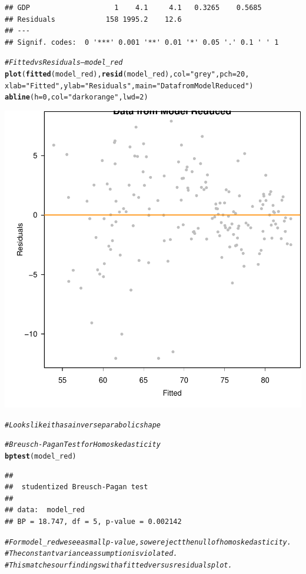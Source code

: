 \documentclass{article}\usepackage[]{graphicx}\usepackage[]{color}
\makeatletter
\newcommand{\hlnum}[1]{\textcolor[rgb]{0.686,0.059,0.569}{#1}}%
\newcommand{\hlstr}[1]{\textcolor[rgb]{0.192,0.494,0.8}{#1}}%
\newcommand{\hlcom}[1]{\textcolor[rgb]{0.678,0.584,0.686}{\textit{#1}}}%
\newcommand{\hlstd}[1]{\textcolor[rgb]{0.345,0.345,0.345}{#1}}%
\newcommand{\hlkwc}[1]{\textcolor[rgb]{0.333,0.667,0.333}{#1}}%
\newcommand{\hlkwd}[1]{\textcolor[rgb]{0.737,0.353,0.396}{\textbf{#1}}}%
\newenvironment{kframe}{%
 \def\at@end@of@kframe{}%
 \ifinner\ifhmode%
  \def\at@end@of@kframe{\end{minipage}}%
  \begin{minipage}{\columnwidth}%
 \fi\fi%
 \def\FrameCommand##1{\hskip\@totalleftmargin \hskip-\fboxsep
 \colorbox{shadecolor}{##1}\hskip-\fboxsep
     \hskip-\linewidth \hskip-\@totalleftmargin \hskip\columnwidth}%
 \MakeFramed {\advance\hsize-\width
   \@totalleftmargin\z@ \linewidth\hsize
   \@setminipage}}%
 {\par\unskip\endMakeFramed%
 \at@end@of@kframe}
\newenvironment{knitrout}{}{} %
\makeatother
\begin{document}
\begin{knitrout}
\begin{kframe}
\begin{verbatim}
## GDP                    1    4.1     4.1   0.3265    0.5685    
## Residuals            158 1995.2    12.6                       
## ---
## Signif. codes:  0 '***' 0.001 '**' 0.01 '*' 0.05 '.' 0.1 ' ' 1
\end{verbatim}
\begin{alltt}
\hlcom{# Fitted vs Residuals --- model_red}
\hlkwd{plot}\hlstd{(}\hlkwd{fitted}\hlstd{(model_red),} \hlkwd{resid}\hlstd{(model_red),} \hlkwc{col} \hlstd{=} \hlstr{"grey"}\hlstd{,} \hlkwc{pch} \hlstd{=} \hlnum{20}\hlstd{,}
     \hlkwc{xlab} \hlstd{=} \hlstr{"Fitted"}\hlstd{,} \hlkwc{ylab} \hlstd{=} \hlstr{"Residuals"}\hlstd{,} \hlkwc{main} \hlstd{=} \hlstr{"Data from Model Reduced"}\hlstd{)}
\hlkwd{abline}\hlstd{(}\hlkwc{h} \hlstd{=} \hlnum{0}\hlstd{,} \hlkwc{col} \hlstd{=} \hlstr{"darkorange"}\hlstd{,} \hlkwc{lwd} \hlstd{=} \hlnum{2}\hlstd{)}
\end{alltt}
\end{kframe}

{\centering \includegraphics[width=.6\linewidth]{figure/Analysis-Rnwauto-report-25} 

}


\begin{kframe}\begin{alltt}
\hlcom{# Looks like it has a inverse parabolic shape}

\hlcom{# Breusch-Pagan Test for Homoskedasticity}
\hlkwd{bptest}\hlstd{(model_red)}
\end{alltt}
\begin{verbatim}
## 
## 	studentized Breusch-Pagan test
## 
## data:  model_red
## BP = 18.747, df = 5, p-value = 0.002142
\end{verbatim}
\begin{alltt}
\hlcom{# For model_red we see a small p-value, so we reject the null of homoskedasticity. }
\hlcom{# The constant variance assumption is violated. }
\hlcom{# This matches our findings with a fitted versus residuals plot.}


\end{alltt}
\end{kframe}
\end{knitrout}
\end{document}
